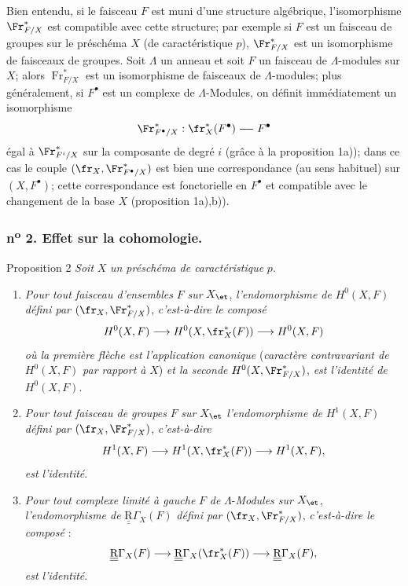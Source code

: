 Bien entendu, si le faisceau $F$ est muni d'une structure algébrique, l'isomorphisme $\Fr^*_{F/X}$ est compatible avec cette structure; par exemple si $F$ est un faisceau de groupes sur le préschéma $X$ (de caractéristique $p$), $\Fr^*_{F/X}$ est un isomorphisme de faisceaux de groupes. Soit $\Lambda$ un anneau et soit $F$ un faisceau de $\Lambda$-modules sur $X$; alors $\operatorname{Fr}^*_{F/X}$ est un isomorphisme de faisceaux de $\Lambda$-modules; plus généralement, si $F^\bullet$ est un complexe de $\Lambda$-Modules, on définit immédiatement un isomorphisme
\[
\Fr^*_{F^\bullet/X}:\fr_X^*(F^\bullet)\relbar\joinrel\relbar F^\bullet
\]
égal à $\Fr^*_{F^i/X}$ sur la composante de degré $i$ (grâce à la proposition 1a)); dans ce cas le couple $(\fr_X,\Fr^*_{F^\bullet/X})$ est bien une correspondance (au sens habituel) sur $(X,F^\bullet)$; cette correspondance est fonctorielle en $F^\bullet$ et compatible avec le changement de la base $X$ (proposition 1a),b)).

\subsubsection*{n\textsuperscript{o} 2. Effet sur la cohomologie.}

\begin{statement}{Proposition 2}
\emph{Soit} $X$ \emph{un préschéma de caractéristique} $p$.
\begin{enumerate}[label=\alph*)]
\item \emph{Pour tout faisceau d'ensembles} $F$ \emph{sur} $X_{\et}$, \emph{l'endomorphisme de} $H^0(X,F)$ \emph{défini par} $(\fr_X,\Fr^*_{F/X})$, \emph{c'est-à-dire le composé}
\[
H^0(X,F)\longrightarrow H^0(X,\fr_X^*(F))\longrightarrow H^0(X,F)
\]
\emph{où la première flèche est l'application canonique} (\emph{caractère contravariant de} $H^0(X,F)$ \emph{par rapport à} $X$) \emph{et la seconde} $H^0(X,\Fr^*_{F/X})$, \emph{est l'identité de} $H^0(X,F)$.
\item
\emph{Pour tout faisceau de groupes} $F$ \emph{sur} $X_{\et}$ \emph{l'endomorphisme de} $H^1(X,F)$ \emph{défini par} $(\fr_X,\Fr^*_{F/X})$, \emph{c'est-à-dire}
\[
H^1(X,F)\longrightarrow H^1(X,\fr_X^*(F))\longrightarrow H^1(X,F),
\]
\emph{est l'identité}.
\item \emph{Pour tout complexe limité à gauche} $F$ \emph{de} $\Lambda$-\emph{Modules sur} $X_{\et}$, \emph{l'endomorphisme de} $\underline{\underline{\mathrm{R}}}\Gamma_X(F)$ \emph{défini par} $(\fr_X,\Fr^*_{F/X})$, \emph{c'est-à-dire le composé} :
\[
\underline{\underline{\mathrm{R}}}\Gamma_X(F)\longrightarrow \underline{\underline{\mathrm{R}}}\Gamma_X(\fr_X^*(F))\longrightarrow \underline{\underline{\mathrm{R}}}\Gamma_X(F),
\]
\emph{est l'identité}.
\end{enumerate}
\end{statement}

